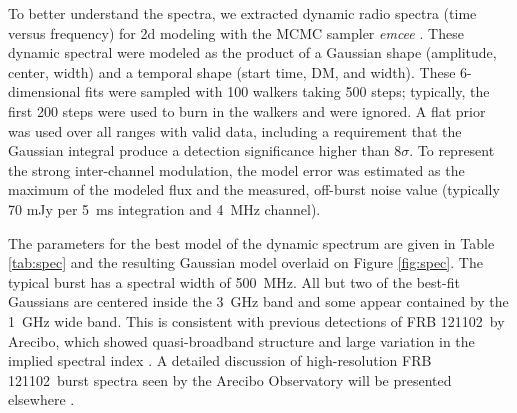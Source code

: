 \documentclass[twocolumn]{aastex61}
\newcommand{\frb}{FRB 121102}
\begin{document}
To better understand the spectra, we extracted dynamic radio spectra (time versus frequency) for 2d modeling with the MCMC sampler \emph{emcee} \citep{2013PASP..125..306F}. These dynamic spectral were modeled as the product of a Gaussian shape (amplitude, center, width) and a temporal shape (start time, DM, and width). These 6-dimensional fits were sampled with 100 walkers taking 500 steps; typically, the first 200 steps were used to burn in the walkers and were ignored. A flat prior was used over all ranges with valid data, including a requirement that the Gaussian integral produce a detection significance higher than 8$\sigma$. To represent the strong inter-channel modulation, the model error was estimated as the maximum of the modeled flux and the measured, off-burst noise value (typically 70 mJy per 5~ms integration and 4~MHz channel).

The parameters for the best model of the dynamic spectrum are given in Table \ref{tab:spec} and the resulting Gaussian model overlaid on Figure \ref{fig:spec}. The typical burst has a spectral width of 500~MHz. All but two of the best-fit Gaussians are centered inside the 3~GHz band and some appear contained by the 1~GHz wide band. This is consistent with previous detections of \frb\ by Arecibo, which showed quasi-broadband structure \citep{2016arXiv160308880S} and large variation in the implied spectral index \citep{2014ApJ...790..101S}. A detailed discussion of high-resolution \frb\ burst spectra seen by the Arecibo Observatory will be presented elsewhere \citep{WEIRD}.
\end{document}
